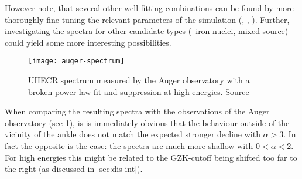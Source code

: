 However note, that several other well fitting combinations can be found by more
thoroughly fine-tuning the relevant parameters of the simulation (\alphasource,
\Robserver, \Brms). Further, investigating the spectra for other candidate
types (\eg~iron nuclei, mixed source) could yield some more interesting
possibilities.

\begin{figure}[ht]
    \centering
    \texttt{[image: auger-spectrum]}
    \caption{UHECR spectrum measured by the Auger observatory with a broken
    power law fit and suppression at high energies. Source\autocite{augerICRC2017}}
    \label{fig:auger-spectrum}
\end{figure}

When comparing the resulting spectra with the observations of the Auger
observatory (see \cref{fig:auger-spectrum}), is is immediately obvious that the
behaviour outside of the vicinity of the ankle does not match the expected
stronger decline with ${\alpha}>3$. In fact the opposite is the case: the
spectra are much more shallow with $0<{\alpha}<2$.
For high energies this might be related to the GZK-cutoff being shifted too far
to the right (as discussed in \cref{sec:dis-int}).


